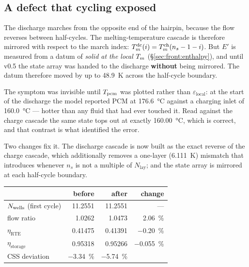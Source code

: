 \subsection{A defect that cycling exposed}
\label{sec:cyclic:reversal}

The discharge marches from the opposite end of the hairpin, because the flow
reverses between half-cycles. The melting-temperature cascade is therefore
mirrored with respect to the march index: $T_{m}^{\mathrm{dc}}(i) =
T_{m}^{\mathrm{ch}}(n_{s}-1-i)$. But $E'$ is measured from a datum of \emph{solid
at the local $T_{m}$} (\S\ref{sec:front:enthalpy}), and until v0.5 the state array
was handed to the discharge \textbf{without} being mirrored. The datum therefore
moved by up to \SI{48.9}{\kelvin} across the half-cycle boundary.

The symptom was invisible until $T_{\mathrm{pcm}}$ was plotted rather than
$\varepsilon_{\mathrm{local}}$: at the start of the discharge the model reported
PCM at \SI{176.6}{\celsius} against a charging inlet of
\SI{160.0}{\celsius} --- hotter than any fluid that had ever touched it. Read
against the charge cascade the same state tops out at exactly
\SI{160.00}{\celsius}, which is correct, and that contrast is what identified
the error.

Two changes fix it. The discharge cascade is now built as the exact reverse of
the charge cascade, which additionally removes a one-layer
(\SI{6.111}{\kelvin}) mismatch that  introduces whenever
$n_{s}$ is not a multiple of $N_{\mathrm{lay}}$; and the state array is mirrored
at each half-cycle boundary.

\begin{center}
\begin{tabular}{@{}l r r r@{}}
\toprule
 & before & after & change \\
\midrule
$N_{\mathrm{wells}}$ (first cycle) & 11.2551 & 11.2551 & --- \\
flow ratio & 1.0262 & 1.0473 & \SI{+2.06}{\percent} \\
$\eta_{\mathrm{RTE}}$ & 0.41475 & 0.41391 & \SI{-0.20}{\percent} \\
$\eta_{\mathrm{storage}}$ & 0.95318 & 0.95266 & \SI{-0.055}{\percent} \\
\midrule
CSS deviation & \SI{-3.34}{\percent} & \SI{-5.74}{\percent} & \\
\bottomrule
\end{tabular}
\end{center}

